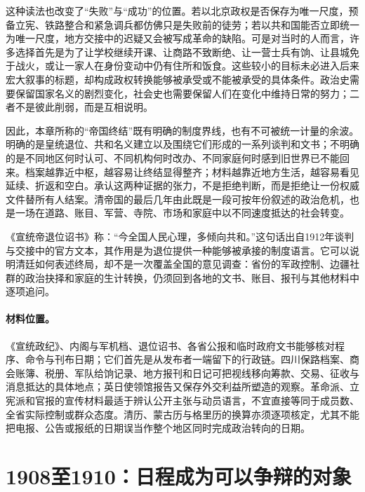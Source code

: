 这种读法也改变了“失败”与“成功”的位置。若以北京政权是否保存为唯一尺度，预备立宪、铁路整合和紧急调兵都仿佛只是失败前的徒劳；若以共和国能否立即统一为唯一尺度，地方交接中的迟疑又会被写成革命的缺陷。可是对当时的人而言，许多选择首先是为了让学校继续开课、让商路不致断绝、让一营士兵有饷、让县城免于战火，或让一家人在身份变动中仍有住所和饭食。这些较小的目标未必进入后来宏大叙事的标题，却构成政权转换能够被承受或不能被承受的具体条件。政治史需要保留国家名义的剧烈变化，社会史也需要保留人们在变化中维持日常的努力；二者不是彼此削弱，而是互相说明。

因此，本章所称的“帝国终结”既有明确的制度界线，也有不可被统一计量的余波。明确的是皇统退位、共和名义建立以及围绕它们形成的一系列谈判和文书；不明确的是不同地区何时认可、不同机构何时改办、不同家庭何时感到旧世界已不能回来。档案越靠近中枢，越容易让终结显得整齐；材料越靠近地方生活，越容易看见延续、折返和空白。承认这两种证据的张力，不是拒绝判断，而是拒绝让一份权威文件替所有人结案。清帝国的最后几年由此既是一段可按年份叙述的政治危机，也是一场在道路、账目、军营、寺院、市场和家庭中以不同速度抵达的社会转变。

\begin{textwindow}[退位诏书不是帝国经验的总计]
《宣统帝退位诏书》称：“今全国人民心理，多倾向共和。”这句话出自1912年谈判与交接中的官方文本，其作用是为退位提供一种能够被承接的制度语言。它可以说明清廷如何表述终局，却不是一次覆盖全国的意见调查：省份的军政控制、边疆社群的政治抉择和家庭的生计转换，仍须回到各地的文书、账目、报刊与其他材料中逐项追问。
\end{textwindow}

\paragraph{材料位置。} 《宣统政纪》、内阁与军机档、退位诏书、各省公报和临时政府文书能够核对程序、命令与刊布日期；它们首先是从发布者一端留下的行政链。四川保路档案、商会账簿、税册、军队给饷记录、地方报刊和日记可把视线移向筹款、交易、征收与消息抵达的具体地点；英日使领馆报告又保存外交利益所塑造的观察。革命派、立宪派和官报的宣传材料最适于辨认公开主张与动员语言，不宜直接等同于成员数、全省实际控制或群众态度。清历、蒙古历与格里历的换算亦须逐项核定，尤其不能把电报、公告或报纸的日期误当作整个地区同时完成政治转向的日期。




\section{1908至1910：日程成为可以争辩的对象}

